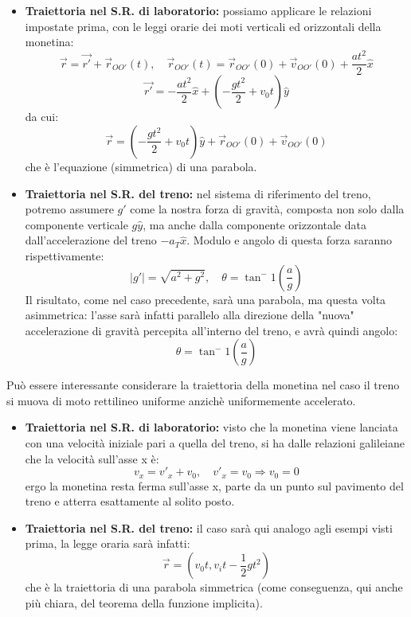 \documentclass[a4paper,12pt]{article}
\begin{document}
\begin{itemize}
  \item \textbf{Traiettoria nel S.R. di laboratorio: } possiamo applicare le relazioni impostate prima,
    con le leggi orarie dei moti verticali ed orizzontali della monetina:
    $$ \vec{r} = \vec{r'} + \vec{r}_{OO'}(t), \quad \vec{r}_{OO'}(t) = \vec{r}_{OO'}(0) + \vec{v}_{OO'}(0) + \frac{at^2}{2}\hat{x} $$
    $$ \vec{r'} = -\frac{at^2}{2}\hat{x} + (-\frac{gt^2}{2} + v_0t)\hat{y} $$
    da cui:
    $$ \vec{r} = (-\frac{gt^2}{2} + v_0t)\hat{y} + \vec{r}_{OO'}(0) + \vec{v}_{OO'}(0) $$
    che è l'equazione (simmetrica) di una parabola.
  \item \textbf{Traiettoria nel S.R. del treno: } nel sistema di riferimento del treno, potremo assumere $g'$ come la nostra forza di gravità,
    composta non solo dalla componente verticale $g\hat{y}$, ma anche dalla componente orizzontale data dall'accelerazione del treno $-a_T\hat{x}$.
    Modulo e angolo di questa forza saranno rispettivamente:
    $$  |g'| = \sqrt{a^2 + g^2}, \quad \theta = \tan^-1(\frac{a}{g})$$
    Il risultato, come nel caso precedente, sarà una parabola, ma questa volta asimmetrica: l'asse sarà infatti
    parallelo alla direzione della "nuova" accelerazione di gravità percepita all'interno del treno, e avrà quindi angolo:
    $$ \theta = \tan^-1(\frac{a}{g}) $$
\end{itemize}
Può essere interessante considerare la traiettoria della monetina nel caso il treno si muova di moto rettilineo uniforme anzichè uniformemente accelerato.
\begin{itemize}
  \item \textbf{Traiettoria nel S.R. di laboratorio: } visto che la monetina viene lanciata con una velocità iniziale pari a quella del
    treno, si ha dalle relazioni galileiane che la velocità sull'asse x è:
    $$ v_x = v'_x + v_0, \quad v'_x = v_0 \Rightarrow v_0 = 0 $$
    ergo la monetina resta ferma sull'asse x, parte da un punto sul pavimento del treno e atterra esattamente al solito posto.
  \item \textbf{Traiettoria nel S.R. del treno: } il caso sarà qui analogo agli esempi visti prima, la legge oraria sarà infatti:
    $$ \vec{r} = (v_0t, v_it - \frac{1}{2}gt^2) $$
    che è la traiettoria di una parabola simmetrica (come conseguenza, qui anche più chiara, del teorema della funzione implicita). 
\end{itemize}
\end{document}
